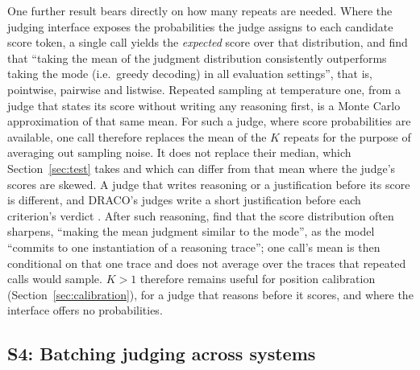\documentclass[11pt]{article}
\begin{document}
One further result bears directly on how many repeats are needed. Where the
judging interface exposes the probabilities the judge assigns to each candidate score
token, a single call yields the \emph{expected} score over that distribution, and
\citet{wang2025judgmentdist} find that ``taking the mean of the judgment distribution
consistently outperforms taking the mode (i.e.\ greedy decoding) in all evaluation
settings'', that is, pointwise, pairwise and listwise. Repeated sampling at temperature one, from a judge that states its score without writing any reasoning first, is a Monte Carlo approximation of that same mean. For such a judge, where score probabilities are available, one call therefore replaces the mean of the $K$ repeats for the purpose of averaging out sampling noise. It does not replace their median, which Section~\ref{sec:test} takes and which can differ from that mean where the judge's scores are skewed. A judge that writes reasoning or a justification before its score is different, and DRACO's judges write a short justification before each criterion's verdict \citep{draco2026}. After such reasoning, \citet{wang2025judgmentdist} find that the score distribution often sharpens, ``making the mean judgment similar to the mode'', as the model ``commits to one instantiation of a reasoning trace''; one call's mean is then conditional on that one trace and does not average over the traces that repeated calls would sample. $K > 1$ therefore remains useful for position calibration (Section~\ref{sec:calibration}), for a judge that reasons before it scores, and where the interface offers no probabilities.

\subsection{S4: Batching judging across systems}
\end{document}
